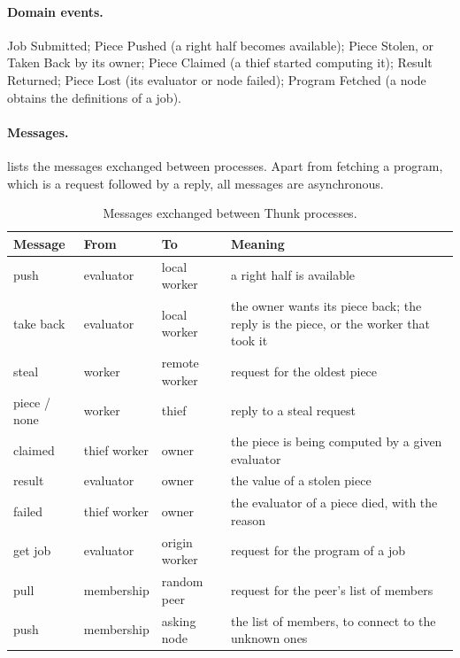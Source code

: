 \documentclass{scrartcl}
\begin{document}
\paragraph{Domain events.}
Job Submitted; Piece Pushed (a right half becomes available); Piece Stolen, or Taken Back by its owner; Piece Claimed (a thief started computing it); Result Returned; Piece Lost (its evaluator or node failed); Program Fetched (a node obtains the definitions of a job).

\paragraph{Messages.}
 lists the messages exchanged between processes.
%
Apart from fetching a program, which is a request followed by a reply, all messages are asynchronous.

\begin{table}
  \centering
  \small
  \begin{tabularx}{\textwidth}{@{}lllY@{}}
    \toprule
    Message & From & To & Meaning \\
    \midrule
    push & evaluator & local worker & a right half is available \\
    take back & evaluator & local worker & the owner wants its piece back; the reply is the piece, or the worker that took it \\
    steal & worker & remote worker & request for the oldest piece \\
    piece / none & worker & thief & reply to a steal request \\
    claimed & thief worker & owner & the piece is being computed by a given evaluator \\
    result & evaluator & owner & the value of a stolen piece \\
    failed & thief worker & owner & the evaluator of a piece died, with the reason \\
    get job & evaluator & origin worker & request for the program of a job \\
    pull & membership & random peer & request for the peer's list of members \\
    push & membership & asking node & the list of members, to connect to the unknown ones \\
    \bottomrule
  \end{tabularx}
  \caption{Messages exchanged between Thunk processes.}
  \label{tab:messages}
\end{table}
\end{document}
